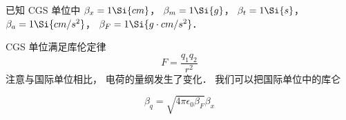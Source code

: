 
\begin{issues}
\issueDraft
\end{issues}


已知 CGS 单位中 $\beta_x = 1\Si{cm}$， $\beta_m = 1\Si{g}$， $\beta_t = 1\Si{s}$， $\beta_a = 1\Si{cm/s^2}$， $\beta_F = 1\Si{g \cdot cm/s^2}$．

CGS 单位满足库伦定律
\begin{equation}
F = \frac{q_1 q_2}{r^2}
\end{equation}
注意与国际单位相比， 电荷的量纲发生了变化． 我们可以把国际单位中的库仑

\begin{equation}
\beta_q = \sqrt{4\pi\epsilon_0\beta_F} \beta_x
\end{equation}
